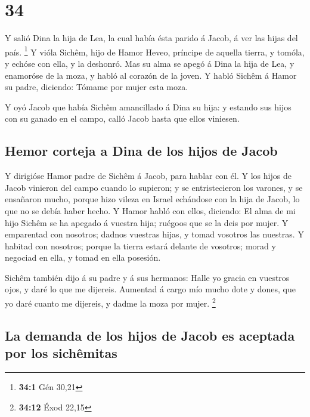 \hypertarget{section-33}{%
\section{34}\label{section-33}}

 Y salió Dina la hija de Lea, la cual había ésta parido á
Jacob, á ver las hijas del país. \footnote{\textbf{34:1} Gén 30,21}
 Y vióla Sichêm, hijo de Hamor Heveo, príncipe de aquella
tierra, y tomóla, y echóse con ella, y la deshonró.  Mas
su alma se apegó á Dina la hija de Lea, y enamoróse de la moza, y habló
al corazón de la joven.  Y habló Sichêm á Hamor su padre,
diciendo: Tómame por mujer esta moza.

 Y oyó Jacob que había Sichêm amancillado á Dina su hija:
y estando sus hijos con su ganado en el campo, calló Jacob hasta que
ellos viniesen.

\hypertarget{hemor-corteja-a-dina-de-los-hijos-de-jacob}{%
\subsection{Hemor corteja a Dina de los hijos de
Jacob}\label{hemor-corteja-a-dina-de-los-hijos-de-jacob}}

 Y dirigióse Hamor padre de Sichêm á Jacob, para hablar
con él.  Y los hijos de Jacob vinieron del campo cuando lo
supieron; y se entristecieron los varones, y se ensañaron mucho, porque
hizo vileza en Israel echándose con la hija de Jacob, lo que no se debía
haber hecho.  Y Hamor habló con ellos, diciendo: El alma
de mi hijo Sichêm se ha apegado á vuestra hija; ruégoos que se la deis
por mujer.  Y emparentad con nosotros; dadnos vuestras
hijas, y tomad vosotros las nuestras.  Y habitad con
nosotros; porque la tierra estará delante de vosotros; morad y negociad
en ella, y tomad en ella posesión.

 Sichêm también dijo á su padre y á sus hermanos: Halle
yo gracia en vuestros ojos, y daré lo que me dijereis. 
Aumentad á cargo mío mucho dote y dones, que yo daré cuanto me dijereis,
y dadme la moza por mujer. \footnote{\textbf{34:12} Éxod 22,15}

\hypertarget{la-demanda-de-los-hijos-de-jacob-es-aceptada-por-los-sichuxeamitas}{%
\subsection{La demanda de los hijos de Jacob es aceptada por los
sichêmitas}\label{la-demanda-de-los-hijos-de-jacob-es-aceptada-por-los-sichuxeamitas}}

